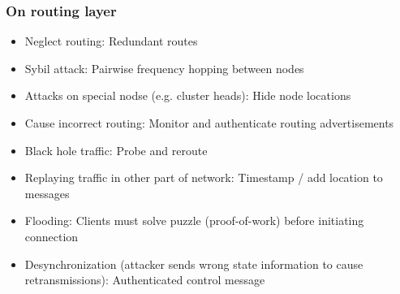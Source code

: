 \subsubsection{On routing layer}

\begin{itemize}
		\item Neglect routing: Redundant routes
		\item Sybil attack: Pairwise frequency hopping between nodes
		\item Attacks on special nodse (e.g. cluster heads): Hide node locations
		\item Cause incorrect routing: Monitor and authenticate routing advertisements
		\item Black hole traffic: Probe and reroute
		\item Replaying traffic in other part of network: Timestamp / add location to messages
\end{itemize}


\begin{itemize}
		\item Flooding: Clients must solve puzzle (proof-of-work) before initiating connection
		\item Desynchronization (attacker sends wrong state information to
				cause retransmissions): Authenticated control message
\end{itemize}
